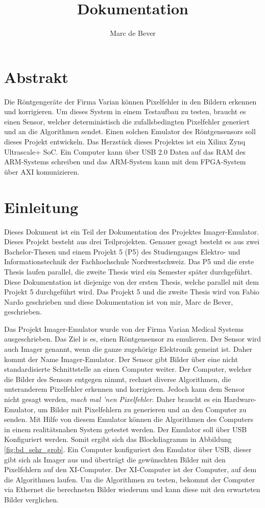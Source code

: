 \documentclass{article}
\title{Dokumentation}
\author{Marc de Bever}
\begin{document}
\maketitle
\tableofcontents

\section{Abstrakt}
Die Röntgengeräte der Firma Varian können Pixelfehler in den Bildern erkennen und korrigieren. Um dieses System in einem Testaufbau zu testen, braucht es einen Sensor, welcher deterministisch die zufallsbedingten Pixelfehler generiert und an die Algorithmen sendet. Einen solchen Emulator des Röntgensensors soll dieses Projekt entwickeln. Das Herzstück dieses Projektes ist ein Xilinx Zynq Ultrascale+ SoC. Ein Computer kann über USB 2.0 Daten auf das RAM des ARM-Systems schreiben und das ARM-System kann mit dem FPGA-System über AXI komunizieren. 

\section{Einleitung}
Dieses Dokument ist ein Teil der Dokumentation des Projektes Imager-Emu\-lator. Dieses Projekt besteht aus drei Teilprojekten. 
Genauer gesagt besteht es aus zwei Bachelor-Thesen und einem Projekt 5 (P5) des Studienganges Elektro- und Informationstechnik der Fachhochschule Nordwestschweiz. 
Das P5 und die erste Thesis laufen parallel, die zweite Thesis wird ein Semester später durchgeführt. Diese Dokumentation ist diejenige von der ersten Thesis, welche parallel mit dem Projekt 5 durchgeführt wird. Das Projekt 5 und die zweite Thesis wird von Fabio Nardo geschrieben und diese Dokumentation ist von mir, Marc de Bever, geschrieben. 

Das Projekt Imager-Emulator wurde von der Firma Varian Medical Systems ausgeschrieben. Das Ziel is es, einen Röntgensensor zu emulieren. Der Sensor wird auch Imager genannt, wenn die ganze zugehörige Elektronik gemeint ist. Daher kommt der Name Imager-Emulator. Der Sensor gibt Bilder über eine nicht standardisierte Schnittstelle an einen Computer weiter. Der Computer, welcher die Bilder des Sensors entgegen nimmt, rechnet diverse Algorithmen, die unteranderem Pixelfehler erkennen und korrigieren. Jedoch kann dem Sensor nicht gesagt werden, \textit{mach mal 'nen Pixelfehler}. Daher braucht es ein Hardware-Emulator, um Bilder mit Pixelfehlern zu generieren und an den Computer zu senden. Mit Hilfe von diesem Emulator können die Algorithmen des Computers in einem realitätsnahen System getestet werden. Der Emulator soll über USB Konfiguriert werden. Somit ergibt sich das Blockdiagramm in Abbildung \ref{fig:bd_sehr_grob}. Ein Computer konfiguriert den Emulator über USB, dieser gibt sich als Imager aus und überträgt die gewünschten Bilder mit den Pixelfehlern auf den XI-Computer. Der XI-Computer ist der Computer, auf dem die Algorithmen laufen. Um die Algorithmen zu testen, bekommt der Computer via Ethernet die berechneten Bilder wiederum  und kann diese mit den erwarteten Bilder verglichen.
\end{document}
